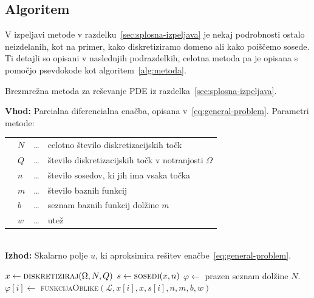 \documentclass[12pt,a4paper,twoside]{article}
\theoremstyle{definition} %
\theoremstyle{plain} %
\numberwithin{equation}{section}
\newcommand{\Rc}{\mathcal{R}}
\renewcommand{\L}{\mathcal{L}}
\renewcommand{\phi}{\varphi}
\newcommand{\algorithmlist}{\hspace*{5pt}}
\begin{document}
\subsection{Algoritem}
V izpeljavi metode v razdelku~\ref{sec:splosna-izpeljava} je nekaj podrobnosti
ostalo neizdelanih, kot na primer, kako diskretiziramo domeno ali kako poiščemo
sosede. Ti detajli so opisani v naslednjih podrazdelkih, celotna metoda pa je opisana
s pomočjo psevdokode kot algoritem~\ref{alg:metoda}.

\begin{algorithm}[!ht]
  \caption{Brezmrežna metoda za reševanje PDE iz
  razdelka~\ref{sec:splosna-izpeljava}.}
  \textbf{Vhod:} Parcialna diferencialna enačba, opisana
  v~\eqref{eq:general-problem}. Parametri metode: \\
  \begin{tabular}{llll}
    \algorithmlist & $N$     & \ldots & celotno število diskretizacijskih točk    \\
    \algorithmlist & $Q$     & \ldots & število diskretizacijskih točk v
    notranjosti $\Omega$ \\
    \algorithmlist & $n$     & \ldots & število sosedov, ki jih ima vsaka točka   \\
    \algorithmlist & $m$     & \ldots & število baznih funkcij                    \\
    \algorithmlist & $b$ & \ldots & seznam baznih funkcij dolžine $m$         \\
    \algorithmlist & $w$     & \ldots & utež
  \end{tabular} \\
  \textbf{Izhod:} Skalarno polje $u$, ki aproksimira rešitev
  enačbe~\eqref{eq:general-problem}.
  \label{alg:metoda}
  \begin{algorithmic}[1]
    \Function{reši}{$\Omega, \L, f, \Rc, g, N, Q, n, m, b, w$}
    \State $x \gets \textsc{diskretiziraj}(\Omega, N, Q)$
    \State $s \gets \textsc{sosedi}(x, n)$ \label{line:kdtree}
    \State $\phi \gets$ prazen seznam dolžine $N$.
     
    \State $\phi[i] \gets$ \textsc{funkcijaOblike}$(\L, x[i], x, s[i], n, m, b, w)$
    \EndFor
      \label{line:shape-loop}

\end{algorithmic}
\end{algorithm}
\end{document}
